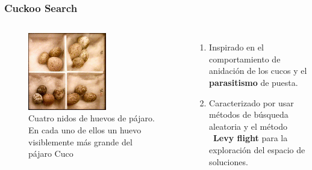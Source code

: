 \begin{frame}
  \frametitle{Cuckoo Search}
  \begin{columns}
    \begin{figure}
      \begin{center}
        \includegraphics[width=0.6\textwidth]{imagenes/chapter3/cucko_eggs.jpg}
      \end{center}
      \caption{Cuatro nidos de huevos de pájaro. En cada uno de ellos un huevo visiblemente más grande del pájaro Cuco \footnotemark[6]}
    \end{figure}
    \begin{enumerate}
      \item Inspirado en el comportamiento de anidación de los cucos y el \textbf{parasitismo} de puesta.
      \item Caracterizado por usar métodos de búsqueda aleatoria y el método \  \textbf{Levy flight} para la exploración del espacio de soluciones.
    \end{enumerate}
  \end{columns}
\end{frame}

